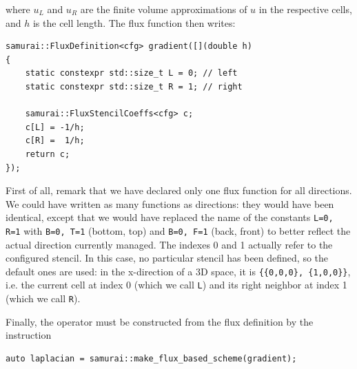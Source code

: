 where $u_L$ and $u_R$ are the finite volume approximations of $u$ in the respective cells, and $h$ is the cell length.
The flux function then writes:

\begin{listing}[ht]
    \begin{verbatim}
samurai::FluxDefinition<cfg> gradient([](double h)
{
    static constexpr std::size_t L = 0; // left
    static constexpr std::size_t R = 1; // right

    samurai::FluxStencilCoeffs<cfg> c;
    c[L] = -1/h;
    c[R] =  1/h;
    return c;
});
\end{verbatim}
\end{listing}

First of all, remark that we have declared only one flux function for all directions.
We could have written as many functions as directions:
they would have been identical, except that we would have replaced the name of the constants
\verb!L=0, R=1! with \verb!B=0, T=1! (bottom, top) and \verb!B=0, F=1! (back, front) to better reflect the actual direction currently managed.
The indexes 0 and 1 actually refer to the configured stencil.
In this case, no particular stencil has been defined, so the default ones are used: in the x-direction of a 3D space,
it is \verb!{{0,0,0}, {1,0,0}}!, i.e. the current cell at index 0 (which we call \verb!L!) and its right neighbor at index 1 (which we call \verb!R!).

Finally, the operator must be constructed from the flux definition by the instruction

\begin{listing}[ht]
    \begin{verbatim}
auto laplacian = samurai::make_flux_based_scheme(gradient);
\end{verbatim}
\end{listing}

